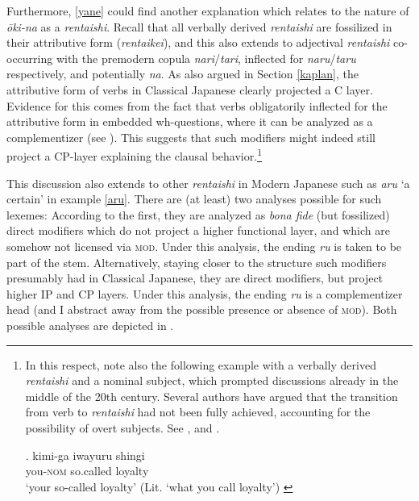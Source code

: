 Furthermore, \ref{yane} could find another explanation which relates to the nature of \textit{ōki-na} as a \textit{rentaishi}. Recall that all verbally derived \textit{rentaishi} are fossilized in their attributive form (\textit{rentaikei}), and this also extends to adjectival \textit{rentaishi} co-occurring with the premodern copula \textit{nari}/\textit{tari}, inflected for \textit{naru}/\textit{taru} respectively, and potentially \textit{na}. As also argued in Section \ref{kaplan}, the attributive form of verbs in Classical Japanese clearly projected a C layer. Evidence for this comes from the fact that verbs obligatorily inflected for the attributive form in embedded wh-questions, where it can be analyzed as a complementizer (see \citealt{kinsui:1995:iwayuru, kaplan:1995:the, hiraiwa:2005:dimensions}). This suggests that such modifiers might indeed still project a CP-layer explaining the clausal behavior.\footnote{In this respect, note also the following example with a verbally derived \textit{rentaishi} and a nominal subject, which prompted discussions already in the middle of the 20th century. Several authors have argued that the transition from verb to \textit{rentaishi} had not been fully achieved, accounting for the possibility of overt subjects. See \citet{sekine:1937:fukutaishi}, \citet{matsushita:1976:kaisen} and \citet{kieda:1938:koto}.

\par

\exg. kimi-ga iwayuru shingi\\
you-\textsc{nom} so.called loyalty\\
`your so-called loyalty' (Lit. `what you call loyalty’) \null \hfill \citep[1:28]{sekine:1937:fukutaishi}

\par

} 

This discussion also extends to other \textit{rentaishi} in Modern Japanese such as \textit{aru} `a certain’ in example \ref{aru}. There are (at least) two analyses possible for such lexemes: According to the first, they are analyzed as \textit{bona fide} (but fossilized) direct modifiers which do not project a higher functional layer, and which are somehow not licensed via \textsc{mod}. Under this analysis, the ending \textit{ru} is taken to be part of the stem. Alternatively, staying closer to the structure such modifiers presumably had in Classical Japanese, they are direct modifiers, but project higher IP and CP layers. Under this analysis, the ending \textit{ru} is a complementizer head (and I abstract away from the possible presence or absence of \textsc{mod}). Both possible analyses are depicted in . 


